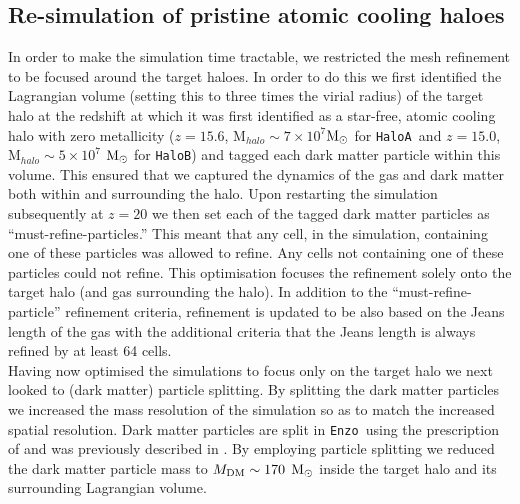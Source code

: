 \documentclass[twocolumn,iop,revtex4]{openjournal}
\newcommand{\enzo}{\texttt{Enzo~}}
\newcommand{\msolar} {$\rm{M_{\odot}}~$}
\newcommand{\ha} {\texttt{HaloA~}}
\newcommand{\hbc} {\texttt{HaloB}}
\begin{document}
 \subsection{Re-simulation of pristine atomic cooling haloes} \label{Sec:Resimulation}
In order to make the simulation time tractable, we restricted the mesh refinement to be focused
around the target haloes. In order to do this we first identified the Lagrangian
volume (setting this to three times the virial radius) of the target halo
at the redshift at which it was first identified as a star-free, atomic cooling halo with zero
metallicity ($z = 15.6$, M$_{halo} \sim 7 \times 10^7 $\msolar for \ha and $z = 15.0$,
M$_{halo} \sim 5 \times 10^7$ \msolar for \hbc) and tagged each dark matter particle within this volume. This ensured
 that we  captured the dynamics of the gas and dark matter both within and surrounding the halo.
 Upon restarting
 the simulation subsequently at $z = 20$ we then set each of the tagged dark matter particles as
 ``must-refine-particles.'' This meant that any cell, in the simulation, containing one of these
 particles was allowed to refine. Any cells not containing one of these particles could not refine.
 This optimisation focuses the refinement solely onto the target halo (and gas surrounding the halo).
 In addition to the ``must-refine-particle'' refinement criteria,  refinement is updated to be
 also based on the Jeans length of the
 gas with the additional criteria that the Jeans length is always refined by at least 64 cells. \\ 
 \indent Having now optimised the simulations to focus only on the target halo 
 we next looked to (dark matter) particle splitting. By splitting the dark matter
 particles we increased the mass resolution of the simulation so as to match the increased spatial
 resolution. Dark matter particles are split in \enzo using the prescription of
 \cite{Kitsionas_2002} and was previously described in \cite{Regan_2015}. By employing particle
 splitting we reduced the dark matter particle mass to $M_{\rm DM} \sim 170$ \msolar inside the
 target halo and its surrounding Lagrangian volume. 
\end{document}
